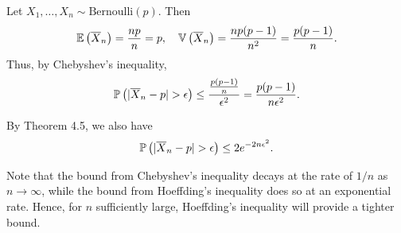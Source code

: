 \begin{ex}
  Let $X_1,\ldots,X_n\sim\text{Bernoulli}(p)$. Then
  \[
    \mathbb{E}\left(\overline{X}_n\right)=\frac{np}{n}=p,\quad
    \mathbb{V}\left(\overline{X}_n\right)=\frac{np(p-1)}{n^2}=\frac{p(p-1)}{n}.
  \]
  Thus, by Chebyshev's inequality,
  \[
    \P{|\overline{X}_n-p|>\epsilon}
    \leq \frac{\frac{p(p-1)}{n}}{\epsilon^2}
    =\frac{p(p-1)}{n\epsilon^2}.
  \]

  By Theorem 4.5, we also have
  \[
    \P{|\overline{X}_n-p|>\epsilon}
    \leq 2e^{-2n\epsilon^2}.
  \]

  Note that the bound from Chebyshev's inequality decays at the rate of $1/n$
  as $n\to\infty$, while the bound from Hoeffding's inequality does so at an
  exponential rate. Hence, for $n$ sufficiently large, Hoeffding's inequality
  will provide a tighter bound.
\end{ex}

